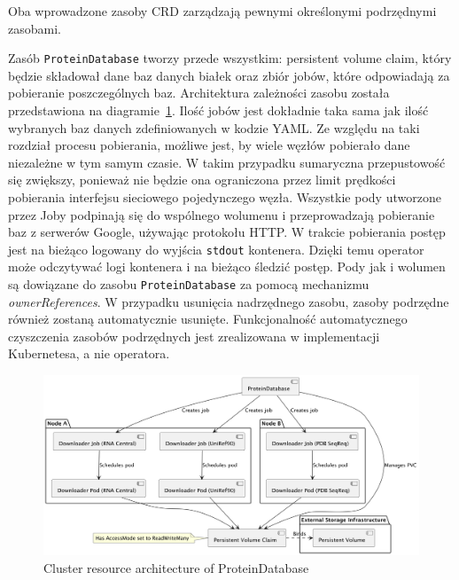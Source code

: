 Oba wprowadzone zasoby CRD zarządzają pewnymi określonymi podrzędnymi zasobami.

Zasób \texttt{ProteinDatabase} tworzy przede wszystkim: persistent volume claim, który będzie składował dane baz danych białek oraz zbiór jobów, które odpowiadają za pobieranie poszczególnych baz.
Architektura zależności zasobu została przedstawiona na diagramie~\ref{fig:proteindatabase}.
Ilość jobów jest dokładnie taka sama jak ilość wybranych baz danych zdefiniowanych w kodzie YAML.
Ze względu na taki rozdział procesu pobierania, możliwe jest, by wiele węzłów pobierało dane niezależne w tym samym czasie.
W takim przypadku sumaryczna przepustowość się zwiększy, ponieważ nie będzie ona ograniczona przez limit prędkości pobierania interfejsu sieciowego pojedynczego węzła.
Wszystkie pody utworzone przez Joby podpinają się do wspólnego wolumenu i przeprowadzają pobieranie baz z serwerów Google, używając protokołu HTTP.
W trakcie pobierania postęp jest na bieżąco logowany do wyjścia \texttt{stdout} kontenera.
Dzięki temu operator może odczytywać logi kontenera i na bieżąco śledzić postęp.
Pody jak i wolumen są dowiązane do zasobu \texttt{ProteinDatabase} za pomocą mechanizmu \textit{ownerReferences}.
W przypadku usunięcia nadrzędnego zasobu, zasoby podrzędne również zostaną automatycznie usunięte.
Funkcjonalność automatycznego czyszczenia zasobów podrzędnych jest zrealizowana w implementacji Kubernetesa, a nie operatora.

\begin{figure}[htbp]
    \centering
    \includegraphics[width=\textwidth]{images/proteindatabase}
    \caption{Cluster resource architecture of ProteinDatabase}
    \label{fig:proteindatabase}
\end{figure}

